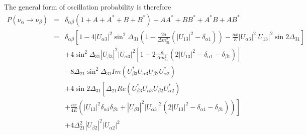 \documentclass[a4 paper,12pt]{report}%
\begin{document}
The general form of oscillation probability is therefore
 \begin{eqnarray}\label{71} \nonumber
P(\nu_\alpha \rightarrow \nu_\beta) &=&\delta_{\alpha\beta}(1 + A + A^* + B + B^*) + AA^* + BB^* + A^*B + AB^*\\ \nonumber
&=&\delta_{\alpha\beta}\left[ 1- 4|U_{\alpha 3}|^2\sin^2\Delta_{31}\left(1-\frac{2a}{\Delta m^2_{31}}(|U_{13}|^2-\delta_{\alpha 1})\right)-\frac{ax}{E}|U_{\alpha 3}|^2|U_{13}|^2\sin2\Delta_{31}\right] \\ \nonumber
&&+4\sin^2\Delta_{31}|U_{\beta 3}|^2|U_{\alpha 3}|^2\left[1-2\frac{a}{\Delta m^2_{31}}(2|U_{13}|^2- \delta_{\alpha 1} - \delta_{\beta 1})\right]\\ \nonumber
&&- 8 \Delta_{21}\sin^2\Delta_{31}Im(U^*_{\beta 3}U_{\alpha 3}U_{\beta 2}U^*_{\alpha 2})\\ \nonumber
&&+4\sin2\Delta_{31}\left[\Delta_{21}Re(U^*_{\beta 3}U_{\alpha 3}U_{\beta 2}U^*_{\alpha 2})\right.\\ \nonumber
&&\left. + \frac{ax}{4E}\left(|U_{13}|^2\delta_{\alpha 1}\delta_{\beta 1}+|U_{\beta 3}|^2|U_{\alpha 3}|^2(2|U_{13}|^2-\delta_{\alpha 1}-\delta_{\beta 1})\right)\right] \\
&&+4\Delta_{21}^2|U_{\beta 2}|^2|U_{\alpha 2}|^2 
\end{eqnarray}\par
\end{document}

